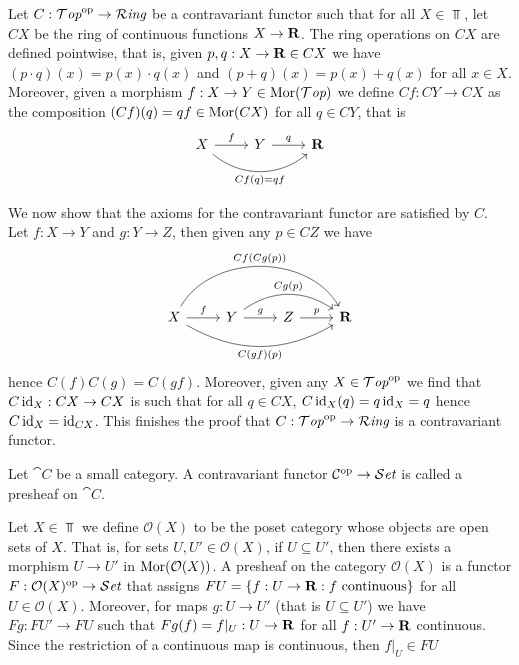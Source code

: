 \begin{example}[\(\Top^\op \to \Rng\)]
  Let \(C: {\mathcal{T}\textit{op}}^{\mathrm{op}} \to {\mathcal{R}\textit{ing}}\) be a contravariant functor such that
  for all \(X \in \Top\), let \(C X\) be the ring of continuous functions
  \(X \to \mathbf{R}\). The ring operations on \(C X\) are defined pointwise,
  that is, given \(p, q: X \to \mathbf{R} \in C X\) we have \((p \cdot q) (x) =
  p(x) \cdot q(x)\) and \((p + q)(x) = p(x) + q(x)\) for all \(x \in X\).
  Moreover, given a morphism \(f: X \to Y \in \operatorname{Mor}({\mathcal{T}\textit{op}})\) we define \(C f:
  C Y \to C X\) as the composition \((C f)(q) = q f \in \operatorname{Mor}(C X)\) for all \(q
  \in C Y\), that is
  \[
    \begin{tikzcd}
      X \ar[r, "f"] \ar[rr, bend right = 40, swap, "C f(q) = q f"]
      & Y \ar[r, "q"] & \R
    \end{tikzcd}
  \]

  We now show that the axioms for the contravariant functor are satisfied by
  \(C\). Let \(f: X \to Y\) and \(g: Y \to Z\), then given any \(p \in C Z\) we
  have
  \[
    \begin{tikzcd}
      X \ar[r, "f"]
      \ar[rrr, bend left = 60, "C f(C g (p))"]
      \ar[rrr, bend right, swap, "C (g f)(p)"]
      & Y \ar[r, "g"]
      \ar[rr, bend left = 35, "C g(p)"]
      & Z \ar[r, "p"] & \R
    \end{tikzcd}
  \]
  hence \(C (f) C (g) = C (g f)\). Moreover, given any \(X \in {\mathcal{T}\textit{op}}^{\mathrm{op}}\)
  we find that \(C \operatorname{id}_X: C X \to C X\) is such that for all \(q \in C X\), \(C
  \operatorname{id}_X (q) = q \operatorname{id}_X = q\) hence \(C \operatorname{id}_X = \operatorname{id}_{C X}\). This finishes the
  proof that \(C: {\mathcal{T}\textit{op}}^{\mathrm{op}} \to {\mathcal{R}\textit{ing}}\) is a contravariant functor.
\end{example}

\begin{definition}[Presheaf]\label{def: presheaf}
  Let \(\cat C\) be a small category. A contravariant functor \(\mathcal C^{\mathrm{op}} \to
  {\mathcal{S}\textit{et}}\) is called a presheaf on \(\cat C\).
\end{definition}

\begin{example}
  Let \(X \in \Top\) we define \(\mathcal O(X)\) to be the poset category
  whose objects are open sets of \(X\). That is, for sets \(U, U' \in \mathcal
  O(X)\), if \(U \subseteq U'\), then there exists a morphism \(U \to U'\) in
  \(\operatorname{Mor}(\mathcal O(X))\). A presheaf on the category \(\mathcal O(X)\) is a
  functor \(F: \mathcal O(X)^{\mathrm{op}} \to {\mathcal{S}\textit{et}}\) that assigns \(F U = \{f: U \to
  \mathbf{R}: f \text{ continuous}\}\) for all \(U \in \mathcal O(X)\).
  Moreover, for maps \(g: U \to U'\) (that is \(U \subseteq U'\)) we have \(F g:
  F U' \to F U\) such that \(F g(f) = f|_U: U \to \mathbf{R}\) for all \(f: U'
  \to \mathbf{R}\) continuous. Since the restriction of a continuous map is
  continuous, then \(f|_U \in F U\)
\end{example}

